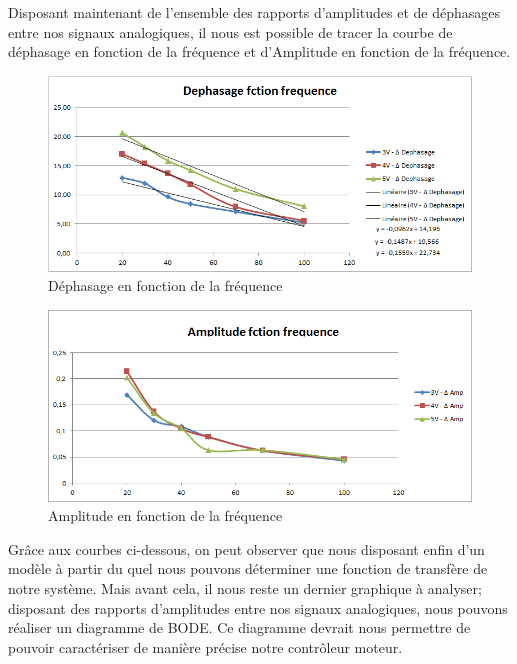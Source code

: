 \documentclass[french,a4paper,12pt]{report}
\begin{document}
	Disposant maintenant de l'ensemble des rapports d'amplitudes et de déphasages entre nos signaux analogiques, il nous est possible de tracer la courbe de déphasage en fonction de la fréquence et d'Amplitude en fonction de la fréquence.
	 	
		\begin{figure}[!ht]
    \center
  	\includegraphics[width=15cm]{dFctionFreq.png}
    \caption{Déphasage en fonction de la fréquence}
	\end{figure}	
	
	\begin{figure}[!ht]
    \center
  	\includegraphics[width=15cm]{AFctionFreq.png}
    \caption{Amplitude en fonction de la fréquence}
	\end{figure}
	
	Grâce aux courbes ci-dessous, on peut observer que nous disposant enfin d'un modèle à partir du quel nous pouvons déterminer une fonction de transfère de notre système. Mais avant cela, il nous reste un dernier graphique à analyser; disposant des rapports d'amplitudes entre nos signaux analogiques, nous pouvons réaliser un diagramme de BODE. Ce diagramme devrait nous permettre de pouvoir caractériser de manière précise notre contrôleur moteur.
	
\end{document}

